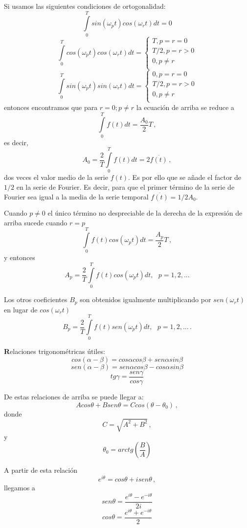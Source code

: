 \documentclass[
]{agujournal2019}
\begin{document}
Si usamos las siguientes condiciones de ortogonalidad:
\[\int\limits^{T}_{0}sin(\omega_p t)cos(\omega_r t) dt=0\]
\[\int\limits^{T}_{0}cos(\omega_p t)cos(\omega_r t) dt=
 \left\lbrace
  \begin{array}{l}
     T, p=r=0 \\
     T/2,p=r>0 \\
     0, p\ne r \\
  \end{array}
  \right.\] \[\int\limits^{T}_{0}sin(\omega_p t)sin(\omega_r t) dt=
 \left\lbrace
  \begin{array}{l}
     0, p=r=0 \\
     T/2,p=r>0 \\
     0, p\ne r \\
  \end{array}
  \right.\] entonces encontramos que para \(r=0;p\ne r\) la ecuación de
arriba se reduce a \[\int\limits^{T}_{0}f(t)dt=\frac{A_0}{2}T\,,\] es
decir, \[A_0=\frac{2}{T}\int\limits^{T}_{0}f(t)dt=2\overline{f(t)}\,,\]
dos veces el valor medio de la serie \(f(t)\). Es por ello que se añade
el factor de \(1/2\) en la serie de Fourier. Es decir, para que el
primer término de la serie de Fourier sea igual a la media de la serie
temporal \(\overline{f(t)}=1/2A_0\).

Cuando \(p\ne0\) el único término no despreciable de la derecha de la
expresión de arriba sucede cuando \(r=p\)
\[\int\limits^{T}_{0}f(t)cos(\omega_p t)dt=\frac{A_p}{2}T\,,\] y
entonces
\[A_p=\frac{2}{T}\int\limits_0^{T} f(t) cos(\omega_p t) dt,\,\,\,\,p=1,2,...\]

Los otros coeficientes \(B_p\) son obtenidos igualmente multiplicando
por \(sen(\omega_r t)\) en lugar de \(cos(\omega_r t)\)
\[B_p=\frac{2}{T}\int\limits_0^{T} f(t) sen(\omega_p t) dt,\,\,\,\,p=1,2,...\,.\]

\begin{framed}
{\noindent \textbf Relaciones trigonométricas útiles:}
\\
$$cos(\alpha-\beta)=cos\alpha cos\beta + sen\alpha sin\beta$$
$$sen(\alpha-\beta)=sen\alpha cos\beta - cos\alpha sin\beta$$
$$tg\gamma=\frac{sen\gamma}{cos\gamma}$$

De estas relaciones de arriba se puede llegar a:
$$Acos\theta + Bsen\theta=Ccos(\theta-\theta_0)\,,$$
donde
$$C=\sqrt{A^2 + B^2}\,,$$
y
$$\theta_0=arctg{\left(\frac{B}{A}\right)}$$

A partir de esta relación
$$e^{i\theta}=cos\theta+isen\theta\,,$$
llegamos a
$$sen\theta=\frac{e^{i\theta}-e^{-i\theta}}{2i}$$
$$cos\theta=\frac{e^{i\theta}+e^{-i\theta}}{2}$$
\end{framed}
\end{document}
